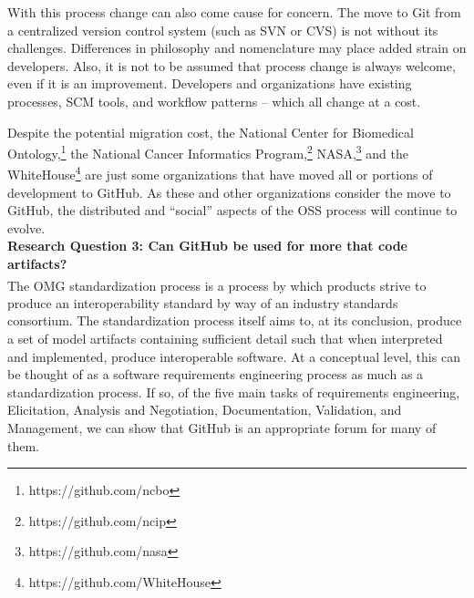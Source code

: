 \documentclass{proc}
\begin{document}
{{{{{With this process change can also come cause for concern. The move to Git from a centralized version control system (such as SVN or CVS) is not without its challenges. Differences in philosophy and nomenclature may place added strain on developers\cite{bird2009promises}. Also, it is not to be assumed that process change is always welcome\cite{de2009software}, even if it is an improvement. Developers and organizations have existing processes, SCM tools, and workflow patterns -- which all change at a cost.

Despite the potential migration cost, the National Center for Biomedical Ontology,\footnote{https://github.com/ncbo} the National Cancer Informatics Program,\footnote{https://github.com/ncip} NASA,\footnote{https://github.com/nasa} and the WhiteHouse\footnote{https://github.com/WhiteHouse} are just some organizations that have moved all or portions of development to GitHub. As these and other organizations consider the move to GitHub, the distributed and ``social'' aspects of the OSS process will continue to evolve.\\

\noindent \textbf{Research Question 3: Can GitHub be used for more that code artifacts?}\\
The OMG\textsuperscript{\textregistered} standardization process is a process by which products strive to produce an interoperability standard by way of an industry standards consortium\cite{omgTechProcess}.
The standardization process itself aims to, at its conclusion, produce a set of model artifacts containing sufficient detail such that when interpreted and implemented, produce interoperable software.
At a conceptual level, this can be thought of as a software requirements engineering process as much as a standardization process. If so, of the five main tasks of requirements engineering, Elicitation, Analysis and Negotiation, Documentation, Validation, and Management,\cite{sommerville1998requirements} we can show that GitHub is an appropriate forum for many of them.

}}}}}
\end{document}
